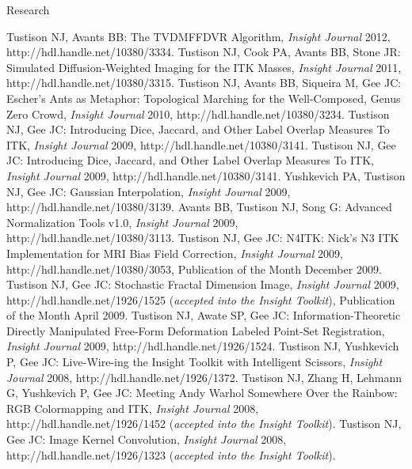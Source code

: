 \documentclass{resume}
\def\-{\discretionary{}{}{}}
\begin{document}
\begin{category}{Research}
   \begin{itemize} 
     \citemnobullet Tustison NJ, Avants BB:  The TVDMFFDVR Algorithm, {\em Insight Journal} 2012, http:\-//hdl\-.\-handle\-.\-net/10380/3334. 
     \citemnobullet Tustison NJ, Cook PA, Avants BB, Stone JR:  Simulated Diffusion-Weighted Imaging for the ITK Masses, {\em Insight Journal} 2011, http:\-//hdl\-.\-handle\-.\-net/10380/3315. 
   \citemnobullet  Tustison NJ, Avants BB, Siqueira M, Gee JC:  Escher's Ants as Metaphor: Topological Marching for the Well-Composed, Genus Zero Crowd, {\em Insight Journal} 2010, http:\-//hdl\-.\-handle\-.\-net/10380/3234. 
    \citemnobullet Tustison NJ, Gee JC:  Introducing Dice, Jaccard, and Other Label Overlap Measures To ITK, {\em Insight Journal} 2009, http:\-//hdl\-.\-handle\-.\-net/10380/3141.
    \citemnobullet Tustison NJ, Gee JC:  Introducing Dice, Jaccard, and Other Label Overlap Measures To ITK, {\em Insight Journal} 2009, http:\-//hdl\-.\-handle\-.\-net/10380/3141.
    \citemnobullet Yushkevich PA, Tustison NJ, Gee JC:  Gaussian Interpolation, {\em Insight Journal} 2009, http:\-//hdl\-.\-handle\-.\-net/10380/3139.
   \citemnobullet  Avants BB, Tustison NJ,  Song G: Advanced Normalization Tools v1.0,   {\em Insight Journal} 2009, http:\-//hdl\-.\-handle\-.\-net/10380/3113.  
   \citemnobullet  Tustison NJ,  Gee JC:  N4ITK:  Nick's N3 ITK Implementation for MRI Bias Field Correction,   {\em Insight Journal} 2009, http:\-//hdl\-.\-handle\-.\-net/10380/3053, Publication of the Month December 2009.  
   \citemnobullet  Tustison NJ,  Gee JC:  Stochastic Fractal Dimension Image,   {\em Insight Journal} 2009, http:\-//hdl\-.\-handle\-.\-net/1926/1525 ({\em accepted into the Insight Toolkit}), Publication of the Month April 2009.  
   \citemnobullet  Tustison NJ,  Awate SP, Gee JC:  Information-Theoretic Directly Manipulated Free-Form Deformation Labeled Point-Set Registration,   {\em Insight Journal} 2009, http:\-//hdl\-.\-handle\-.\-net/1926/1524.  
   \citemnobullet  Tustison NJ,  Yushkevich P, Gee JC:  Live-Wire-ing the Insight Toolkit with Intelligent Scissors,   {\em Insight Journal} 2008, http:\-//hdl\-.\-handle\-.\-net/1926/1372.  
   \citemnobullet  Tustison NJ,  Zhang H, Lehmann G, Yushkevich P, Gee JC: Meeting Andy Warhol Somewhere Over the Rainbow: RGB Colormapping and ITK,   {\em Insight Journal} 2008, http:\-//hdl\-.\-handle\-.\-net/1926/1452 ({\em accepted into the Insight Toolkit}).  
   \citemnobullet  Tustison NJ,  Gee JC:  Image Kernel Convolution,   {\em Insight Journal} 2008, http:\-//hdl\-.\-handle\-.\-net/1926/1323 ({\em accepted into the Insight Toolkit}).  

\end{itemize}
\end{category}
\end{document}
